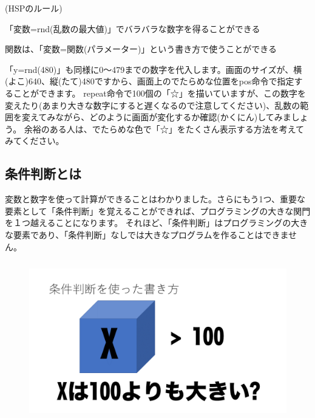 \begin{description}
    \item (HSPのルール)
\end{description}

\begin{description}
    \item 「変数=rnd(乱数の最大値)」でバラバラな数字を得ることができる
    \item 関数は、「変数=関数(パラメーター)」という書き方で使うことができる
\end{description}

「y=rnd(480)」も同様に0〜479までの数字を代入します。画面のサイズが、横(よこ)640、縦(たて)480ですから、画面上のでたらめな位置をpos命令で指定することができます。
repeat命令で100個の「☆」を描いていますが、この数字を変えたり(あまり大きな数字にすると遅くなるので注意してください)、乱数の範囲を変えてみながら、どのように画面が変化するか確認(かくにん)してみましょう。
余裕のある人は、でたらめな色で「☆」をたくさん表示する方法を考えてみてください。

\subsection{条件判断とは}

変数と数字を使って計算ができることはわかりました。さらにもう1つ、重要な要素として「条件判断」を覚えることができれば、プログラミングの大きな関門を１つ越えることになります。
それほど、「条件判断」はプログラミングの大きな要素であり、「条件判断」なしでは大きなプログラムを作ることはできません。

\begin{figure}[H]
    \begin{center}
        \includegraphics[keepaspectratio,width=12.33cm,height=6.939cm]{text02-img/text02-img049.png}
    \end{center}
\end{figure}

